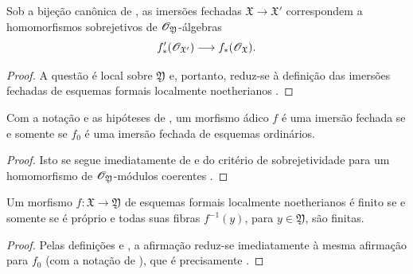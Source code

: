 \begin{corollary}[4.8.9]
\label{III.4.8.9}
Sob a bijeção canônica de , as imersões
fechadas $\mathfrak{X}\to\mathfrak{X}'$ correspondem a
homomorfismos sobrejetivos de $\mathscr{O}_{\mathfrak{Y}}$-álgebras
\[
  f'_*(\mathscr{O}_{\mathfrak{X}'})
  \longrightarrow
  f_*(\mathscr{O}_{\mathfrak{X}}).
\]
\end{corollary}

\begin{proof}
A questão é local sobre $\mathfrak{Y}$ e, portanto, reduz-se à
definição das imersões fechadas de esquemas formais localmente
noetherianos .
\end{proof}

\begin{corollary}[4.8.10]
\label{III.4.8.10}
Com a notação e as hipóteses de , um morfismo
ádico $f$ é uma imersão fechada se e somente se $f_0$ é uma
imersão fechada de esquemas ordinários.
\end{corollary}

\begin{proof}
Isto se segue imediatamente de  e do critério de
sobrejetividade para um homomorfismo de
$\mathscr{O}_{\mathfrak{Y}}$-módulos coerentes .
\end{proof}

\begin{proposition}[4.8.11]
\label{III.4.8.11}
Um morfismo $f:\mathfrak{X}\to\mathfrak{Y}$ de esquemas formais
localmente noetherianos
é finito se e somente se é próprio e todas suas fibras
$f^{-1}(y)$, para $y\in\mathfrak{Y}$, são finitas.
\end{proposition}

\begin{proof}
Pelas definições  e , a
afirmação reduz-se imediatamente à mesma afirmação para $f_0$
(com a notação de ), que é precisamente
.
\end{proof}
